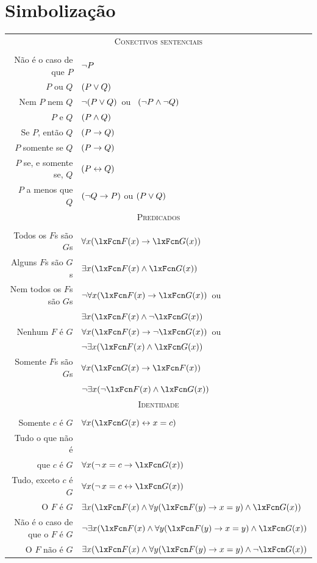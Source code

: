 \section{Simbolização}
\begin{center}
\label{app.symbolization}
\begin{tabular*}{\textwidth}{rl}
\multicolumn{2}{c}{\textsc{Conectivos sentenciais}}\\ \\
Não é o caso de que $P$ & $\neg P$\\
$P$ ou $Q$ & $(P \vee Q)$\\
Nem $P$ nem $Q$ & $\neg(P \vee Q)$\ ou \ $(\neg P \wedge \neg Q)$\\
$P$ e $Q$ & $(P \wedge Q)$\\
Se $P$, então $Q$ & $(P \rightarrow Q)$\\
$P$ somente se $Q$ & $(P \rightarrow Q)$\\
$P$ se, e somente se, $Q$ & $(P \leftrightarrow Q)$\\
$P$ a menos que $Q$ & $(\neg Q \rightarrow P )$ ou $(P \vee Q)$\\[12pt]
\multicolumn{2}{c}{\label{SymbolizingPredicates}\textsc{Predicados}}\\ \\
Todos os $F$s são $G$s & $\forall x(\atom{F}{x} \eif \atom{G}{x})$\\
Alguns $F$s são $G$s & $\exists x(\atom{F}{x} \eand \atom{G}{x})$\\
Nem todos os $F$s são $G$s & $\enot\forall x(\atom{F}{x} \eif \atom{G}{x})$\ ou\\
& $\exists x(\atom{F}{x} \eand \enot \atom{G}{x})$\\
Nenhum $F$ é $G$ & $\forall x(\atom{F}{x} \eif\enot \atom{G}{x})$\ ou\\
& $\enot\exists x(\atom{F}{x} \eand \atom{G}{x})$\\
Somente $F$s são $G$s & $\forall x(\atom{G}{x} \eif \atom{F}{x})$\\
& $\enot\exists x(\enot\atom{F}{x} \eand \atom{G}{x})$\\[12pt]
\multicolumn{2}{c}{\textsc{Identidade}}\\ \\
Somente $c$ é $G$ & $\forall x(\atom{G}{x} \eiff x=c)$\\
Tudo o que não é &\\ que $c$
é $G$ & $\forall x(\enot\, {x = c} \eif \atom{G}{x} )$\\
Tudo, exceto $c$
 é $G$ & $\forall x(\enot\, {x = c} \eiff \atom{G}{x} )$\\
O $F$ é $G$ & $\exists x(\atom{F}{x} \eand \forall y(\atom{F}{y} \eif x=y) \eand \atom{G}{x} )$\\
Não é o caso de que
 o $F$ é $G$ & $\enot\exists x(\atom{F}{x} \eand \forall y(\atom{F}{y} \eif x=y) \eand \atom{G}{x} )$\\
O $F$ não é $G$ & $\exists x(\atom{F}{x} \eand \forall y(\atom{F}{y} \eif x=y) \eand \enot \atom{G}{x} )$
\end{tabular*}
\end{center}
